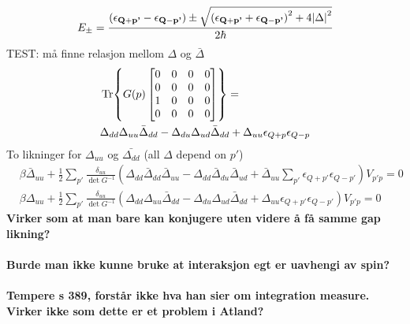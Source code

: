 \documentclass{article}
\begin{document}
\begin{equation}
        E_{\pm} = \frac{\left(\epsilon_{\textbf{Q} + \textbf{p'}} - \epsilon_{\textbf{Q} - \textbf{p'}}\right) \pm \sqrt{\left(\epsilon_{\textbf{Q} + \textbf{p'}} + \epsilon_{\textbf{Q} - \textbf{p'}}\right)^2 + 4 \abs{\Delta}^2 } }{2\hbar}
\end{equation} 
TEST:
må finne relasjon mellom $\Delta$ og $\bar{\Delta}$
\begin{align}
&\Tr{G(p) 
    \begin{bmatrix}
    0 & 0 & 0 & 0 \\
    0 & 0 & 0 & 0 \\ 
    1 & 0 & 0 & 0 \\ 
    0 & 0 & 0 & 0
    \end{bmatrix}}= \\ 
&\Delta_{dd} \Delta_{uu} \bar{\Delta}_{dd} - \Delta_{du} \Delta_{ud} \bar{\Delta}_{dd} + \Delta_{uu} \epsilon_{Q+p} \epsilon_{Q-p}
\end{align}
To likninger for $\Delta_{uu}$ og $\bar{\Delta_{dd}}$ (all $\Delta$ depend on $p'$)
\begin{align}
    &\beta{\bar{\Delta}}_{uu} + \frac{1}{2} \sum_{p'} \frac{\delta_{uu}}{\det{G^{-1}}}\left(\Delta_{dd} \bar{\Delta}_{dd} \bar{\Delta}_{uu} - \Delta_{dd} \bar{\Delta}_{du} \bar{\Delta}_{ud} + \bar{\Delta}_{uu} \sum_{p'} \epsilon_{Q+p'} \epsilon_{Q-p'}\right) V_{p'p} = 0\nonumber\\
    &\beta{\Delta}_{uu} + \frac{1}{2} \sum_{p'} \frac{\delta_{uu}}{\det{G^{-1}}} \left(\Delta_{dd} \Delta_{uu} \bar{\Delta}_{dd} - \Delta_{du} \Delta_{ud} \bar{\Delta}_{dd} + \Delta_{uu} \epsilon_{Q+p'} \epsilon_{Q-p'}\right) V_{p'p} = 0\nonumber
\end{align}
\textbf{Virker som at man bare kan konjugere uten videre å få samme gap likning?}
\\
\\
\textbf{Burde man ikke kunne bruke at interaksjon egt er uavhengi av spin?}
\\
\\
\textbf{Tempere s 389, forstår ikke hva han sier om integration measure. Virker ikke som dette er et problem i Atland?}
\printbibliography
\end{document}
